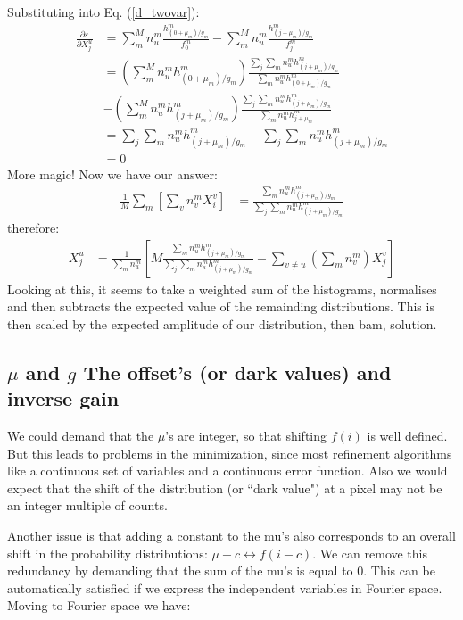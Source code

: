 \documentclass[11pt]{article}
\begin{document}
Substituting into Eq. (\ref{d_twovar}):
\begin{align}
   \frac{\partial \varepsilon}{\partial X^u_j} &= \sum_m^M n^m_u \frac{ h^m_{(0+\mu_m)/g_m}}{f^m_0}- \sum_m^M n^m_u \frac{ h^m_{(j+\mu_m)/g_m}}{f^m_j} \\
   &=  \left(\sum_m^M n^m_u h^m_{(0+\mu_m)/g_m}\right) \frac{\sum_{j}\sum_m n^m_u h^m_{(j+\mu_m)/g_m}}{\sum_m n^m_u h^m_{(0+\mu_m)/g_m}} \\
   & - \left(\sum_m^M n^m_u h^m_{(j+\mu_m)/g_m}\right) \frac{\sum_{j}\sum_m n^m_u h^m_{(j+\mu_m)/g_m}}{\sum_m n^m_u h^m_{j+\mu_m}} \\
   &= \sum_{j}\sum_m n^m_u h^m_{(j+\mu_m)/g_m} - \sum_{j}\sum_m n^m_u h^m_{(j+\mu_m)/g_m} \\
   &= 0
\end{align}
More magic! Now we have our answer:
\begin{align}
   \frac{1}{M}\sum_m \left[ \sum_v n^m_v X^v_i \right] &= \frac{\sum_m n^m_u h^m_{(j+\mu_m)/g_m}}{\sum_{j}\sum_m n^m_u h^m_{(j+\mu_m)/g_m}}
\end{align}
therefore:
\begin{align}
   X^u_j &= \frac{1}{\sum_m n^m_u}\left[M\frac{\sum_m n^m_u h^m_{(j+\mu_m)/g_m}}{\sum_{j}\sum_m n^m_u h^m_{(j+\mu_m)/g_m}} - \sum_{v\neq u} (\sum_m n^m_v) X^v_j \right] 
\end{align}
Looking at this, it seems to take a weighted sum of the histograms, normalises and then subtracts the expected value of the remainding distributions. This is then scaled by the expected amplitude of our distribution, then bam, solution.






\subsection{$\mu$ and $g$ The offset's (or dark values) and inverse gain}
We could demand that the $\mu$'s are integer, so that shifting $f(i)$ is well defined. But this leads to problems in the minimization, since most refinement algorithms like a continuous set of variables and a continuous error function. Also we would expect that the shift of the distribution (or ``dark value") at a pixel may not be an integer multiple of counts. 

Another issue is that adding a constant to the mu's also corresponds to an overall shift in the probability distributions: $\mu + c \longleftrightarrow  f(i - c)$. We can remove this redundancy by demanding that the sum of the mu's is equal to 0. This can be automatically satisfied if we express the independent variables in Fourier space. Moving to Fourier space we have:
\end{document}
